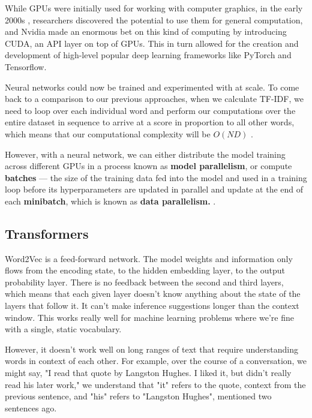 \documentclass[11pt, table]{diazessay} %
\begin{document}
\begin{sloppypar}
While GPUs were initially used for working with computer graphics, in the early 2000s \citep{oancea2014gpgpu}, researchers discovered the potential to use them for general computation, and Nvidia made an enormous bet on this kind of computing by introducing CUDA, an API layer on top of GPUs. This in turn allowed for the creation and development of high-level popular deep learning frameworks like PyTorch and Tensorflow.

Neural networks could now be trained and experimented with at scale. To come back to a comparison to our previous approaches, when we calculate TF-IDF, we need to loop over each individual word and perform our computations over the entire dataset in sequence to arrive at a score in proportion to all other words, which means that our computational complexity will be $O(N D)$ \citep{cong2016novel}.  

However, with a neural network, we can either distribute the model training across different GPUs in a process known as \textbf{model parallelism}, or compute \textbf{batches} --- the size of the training data fed into the model and used in a training loop before its hyperparameters are updated in parallel and update at the end of each \textbf{minibatch}, which is known as \textbf{data parallelism.} \citep{shallue2018measuring}.


\subsection{Transformers}

Word2Vec is a feed-forward network. The model weights and information only flows from the encoding state, to the hidden embedding layer, to the output probability layer. There is no feedback between the second and third layers, which means that each given layer doesn't know anything about the state of the layers that follow it. It can't make inference suggestions longer than the context window. This works really well for machine learning problems where we're fine with a single, static vocabulary.

However, it doesn't work well on long ranges of text that require understanding words in context of each other. For example, over the course of a conversation, we might say, "I read that quote by Langston Hughes. I liked it, but didn't really read his later work," we understand that "it" refers to the quote, context from the previous sentence, and "his" refers to "Langston Hughes", mentioned two sentences ago.


\end{sloppypar}
\end{document}
